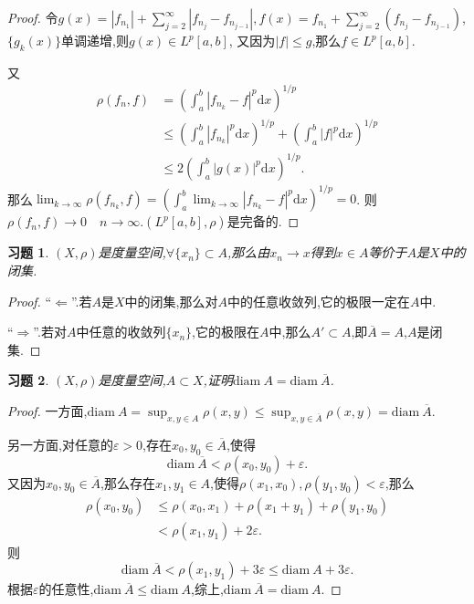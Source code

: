 \documentclass[a4paper,oneside,12pt]{ctexart}
\theoremstyle{plain}
\newtheorem{exercise}{习题}
\theoremstyle{nonumberplain}
\theoremstyle{nonumberplain}
\newtheorem{proof}{证明.}
\newcommand{\dif}{\mathrm{d}}
\renewcommand{\epsilon}{\varepsilon}
\newcommand{\abs}[1]{\left\vert#1\right\vert}
\newcommand{\diam}{\mathrm{diam\ }}
\begin{document}
\begin{proof}
    令$g(x)=\abs{f_{n_1}}+\sum_{j=2}^\infty\abs{f_{n_j}-f_{n_{j-1}}},f(x)=f_{n_1}+\sum_{j=2}^\infty(f_{n_j}-f_{n_{j-1}})$,$\{g_k(x)\}$单调递增,则$g(x)\in L^p[a,b]$,
    又因为$\abs{f}\leqslant g$,那么$f\in L^p[a,b]$.

    又
    \begin{align*}
        \rho(f_n,f)&=\left(\int_a^b\abs{f_{n_k}-f}^p\dif x\right)^{1/p}\\
        &\leqslant \left(\int_a^b\abs{f_{n_k}}^p\dif x\right)^{1/p}+\left(\int_a^b\abs{f}^p\dif x\right)^{1/p}\\
        &\leqslant 2\left(\int_a^b\abs{g(x)}^p\dif x\right)^{1/p}.
    \end{align*}
    那么$\lim_{k\to\infty}\rho(f_{n_k},f)=\left(\int_a^b \lim_{k\to\infty}\abs{f_{n_k}-f}^p\dif x\right)^{1/p}=0$.
    则$\rho(f_n,f)\to 0\quad n\to\infty$.$(L^p[a,b],\rho)$是完备的.
\end{proof}

\begin{exercise}
    \label{ex:5}
    $(X,\rho)$是度量空间,$\forall\{x_n\}\subset A$,那么由$x_n\to x$得到$x\in A$等价于$A$是$X$中的闭集.
\end{exercise}

\begin{proof}
    ``$\Leftarrow$''.若$A$是$X$中的闭集,那么对$A$中的任意收敛列,它的极限一定在$A$中.

    ``$\Rightarrow$''.若对$A$中任意的收敛列$\{x_n\}$,它的极限在$A$中,那么$A'\subset A$,即$\overline{A}=A$,$A$是闭集.
\end{proof}

\begin{exercise}
    \label{ex:6}
    $(X,\rho)$是度量空间,$A\subset X$,证明$\diam A=\diam \overline{A}$.
\end{exercise}

\begin{proof}
    一方面,$\diam A=\sup_{x,y\in A}\rho(x,y)\leqslant \sup_{x,y\in\overline{A}}\rho(x,y)=\diam \overline{A}$.

    另一方面,对任意的$\epsilon>0$,存在$x_0,y_0\in\overline{A}$,使得
    \begin{equation*}
        \diam \overline{A}<\rho(x_0,y_0)+\epsilon.
    \end{equation*}
    又因为$x_0,y_0\in\overline{A}$,那么存在$x_1,y_1\in A$,使得$\rho(x_1,x_0),\rho(y_1,y_0)<\epsilon$,那么 
    \begin{align*}
        \rho(x_0,y_0)&\leqslant \rho(x_0,x_1)+\rho(x_1+y_1)+\rho(y_1,y_0)\\
        &<\rho(x_1,y_1)+2\epsilon.
    \end{align*}
    则 
    \begin{equation*}
        \diam \overline{A}<\rho(x_1,y_1)+3\epsilon\leqslant \diam A+3\epsilon.
    \end{equation*}
    根据$\epsilon$的任意性,$\diam\overline{A}\leqslant\diam A$,综上,$\diam\overline{A}=\diam A$.
\end{proof}
\end{document}
